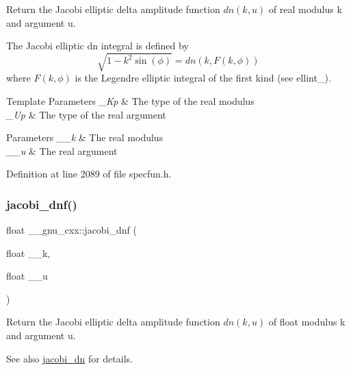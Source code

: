 Return the Jacobi elliptic delta amplitude function $ dn(k,u) $ of real modulus {\ttfamily k} and argument {\ttfamily u}.

The Jacobi elliptic {\ttfamily dn} integral is defined by \[ \sqrt{1 - k^2\sin(\phi)} = dn(k, F(k,\phi)) \] where $ F(k,\phi) $ is the Legendre elliptic integral of the first kind (see ellint\+\_).


\begin{DoxyTemplParams}{Template Parameters}
{\em \+\_\+\+Kp} & The type of the real modulus \\
\hline
{\em \+\_\+\+Up} & The type of the real argument \\
\hline
\end{DoxyTemplParams}

\begin{DoxyParams}{Parameters}
{\em \+\_\+\+\_\+k} & The real modulus \\
\hline
{\em \+\_\+\+\_\+u} & The real argument \\
\hline
\end{DoxyParams}


Definition at line 2089 of file specfun.\+h.

\mbox{\label{group__mathsf__gnu_gae96327d678adc6b5c4051f1c3649549a}} 
\subsubsection{\texorpdfstring{jacobi\+\_\+dnf()}{jacobi\_dnf()}}
{\footnotesize\ttfamily float \+\_\+\+\_\+gnu\+\_\+cxx\+::jacobi\+\_\+dnf (\begin{DoxyParamCaption}\item[{float}]{\+\_\+\+\_\+k,  }\item[{float}]{\+\_\+\+\_\+u }\end{DoxyParamCaption})\hspace{0.3cm}{\ttfamily [inline]}}

Return the Jacobi elliptic delta amplitude function $ dn(k,u) $ of {\ttfamily float} modulus {\ttfamily k} and argument {\ttfamily u}.

\begin{DoxySeeAlso}{See also}
\hyperlink{group__mathsf__gnu_ga0f8fa8d6a77dbc2089d65f3f16876aa9}{jacobi\+\_\+dn} for details. 
\end{DoxySeeAlso}


